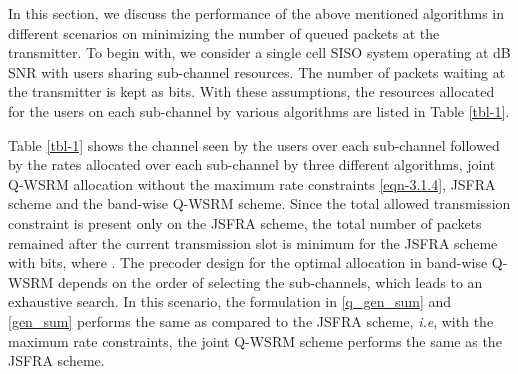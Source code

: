 
In this section, we discuss the performance of the above mentioned algorithms in different scenarios on minimizing the number of queued packets at the transmitter. To begin with, we consider a single cell \ac{SISO} system operating at  dB \ac{SNR} with  users sharing  sub-channel resources. The number of packets waiting at the transmitter is kept as  bits. With these assumptions, the resources allocated for the users on each sub-channel by various algorithms are listed in Table \ref{tbl-1}.

Table \ref{tbl-1} shows the channel seen by the users over each sub-channel followed by the rates allocated over each sub-channel by three different algorithms, joint \ac{Q-WSRM} allocation without the maximum rate constraints \eqref{eqn-3.1.4}, \ac{JSFRA} scheme and the band-wise \ac{Q-WSRM} scheme. Since the total allowed transmission constraint is present only on the \ac{JSFRA} scheme, the total number of packets remained after the current transmission slot is minimum for the \ac{JSFRA} scheme with  bits, where . The precoder design for the optimal allocation in band-wise \ac{Q-WSRM} depends on the order of selecting the sub-channels, which leads to an exhaustive search. In this scenario, the formulation in \eqref{q_gen_sum} and \eqref{gen_sum} performs the same as compared to the \ac{JSFRA} scheme, \textit{i.e}, with the maximum rate constraints, the joint \ac{Q-WSRM} scheme performs the same as the \ac{JSFRA} scheme.


